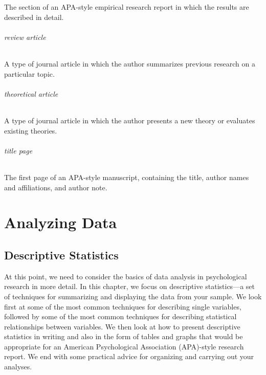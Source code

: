 \documentclass[
]{krantz}
\begin{document}
The section of an APA-style empirical research report in which the results are described in detail.

\paragraph*{review article}\label{review-article-1}

A type of journal article in which the author summarizes previous research on a particular topic.

\paragraph*{theoretical article}\label{theoretical-article-1}

A type of journal article in which the author presents a new theory or evaluates existing theories.

\paragraph*{title page}\label{title-page}

The first page of an APA-style manuscript, containing the title, author names and affiliations, and author note.

\part*{Analyzing Data}\label{part-analyzing-data}


\chapter{Descriptive Statistics}\label{descriptive-statistics}

At this point, we need to consider the basics of data analysis in psychological research in more detail. In this chapter, we focus on descriptive statistics---a set of techniques for summarizing and displaying the data from your sample. We look first at some of the most common techniques for describing single variables, followed by some of the most common techniques for describing statistical relationships between variables. We then look at how to present descriptive statistics in writing and also in the form of tables and graphs that would be appropriate for an American Psychological Association (APA)-style research report. We end with some practical advice for organizing and carrying out your analyses.
\end{document}
